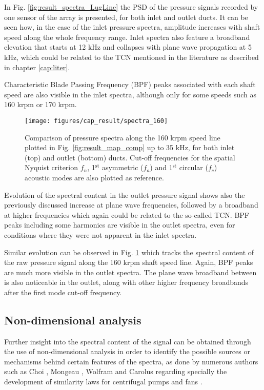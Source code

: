 In Fig. \ref{fig:result_spectra_LugLine} the PSD of the pressure signals recorded by one sensor of the array is presented, for both inlet and outlet ducts. It can be seen how, in the case of the inlet pressure spectra, amplitude increases with shaft speed along the whole frequency range. Inlet spectra also feature a broadband  elevation that starts at 12 kHz and collapses with plane wave propagation at 5 kHz, which could be related to the TCN mentioned in the literature as described in chapter \ref{cap:liter}.

Characteristic Blade Passing Frequency (BPF) peaks associated with each shaft speed are also visible in the inlet spectra, although only for some speeds such as 160 krpm or 170 krpm.

\begin{figure}[tbh!]
\centering
\texttt{[image: figures/cap\_result/spectra\_160]}
\caption[Spectra along the 160 krpm line in the full range]{Comparison of pressure spectra along the 160 krpm speed line plotted in Fig. \ref{fig:result_map_comp} up to 35 kHz, for both inlet (top) and outlet (bottom) ducts. Cut-off frequencies for the spatial Nyquist criterion $f_n$, 1${}^\text{st}$ asymmetric ($f_a$) and 1${}^\text{st}$ circular ($f_c$) acoustic modes are also plotted as reference.}
\label{fig:result_spectra_160}
\end{figure}

Evolution of the spectral content in the outlet pressure signal shows also the previously discussed increase at plane wave frequencies, followed by a broadband at higher frequencies which again could be related to the so-called TCN. BPF peaks including some harmonics are visible in the outlet spectra, even for conditions where they were not apparent in the inlet spectra.

Similar evolution can be observed in Fig. \ref{fig:result_spectra_160} which tracks the spectral content of the raw pressure signal along the 160 krpm shaft speed line. Again, BPF peaks are much more visible in the outlet spectra. The plane wave broadband between is also noticeable in the outlet, along with other higher frequency broadbands after the first mode cut-off frequency.

\subsection{Non-dimensional analysis}

Further insight into the spectral content of the signal can be obtained through the use of non-dimensional analysis in order to identify the possible sources or mechanisms behind certain features of the spectra, as done by numerous authors such as Choi \cite{choi1994aerodynamic,choi2003experiments}, Mongeau \cite{mongeau1993sound,mongeau1995method}, Wolfram \cite{wolfram2009detection,wolfram2010experimental} and Carolus \cite{carolus2000experimental} regarding specially the development of similarity laws for centrifugal pumps and fans \cite{neise1982acoustic}.

